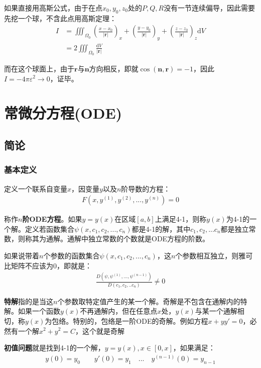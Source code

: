 \documentclass{ctexart}
\let\oldtextbf\textbf
\renewcommand{\textbf}[1]{\textcolor{brown!50!red}{\oldtextbf{#1}}}
\begin{document}
如果直接用高斯公式，由于在点$x_0,y_0,z_0$处的$P,Q,R$没有一节连续偏导，因此需要先挖一个球，不含此点用高斯定理：
\begin{align*} 
I&=\iiint_{\Omega_0}(\frac{x-x_0}{|\bm{r}|})_x+(\frac{y-y_0}{|\bm{r}|})_y+
(\frac{z-z_0}{|\bm{r}|})_z\mathrm{d}V\\
&=2\iiint_{\Omega_0}\frac{\mathrm{d}V }{|\bm{r}|} 
\end{align*}

而在这个球面上，由于$\bm{r}$与$\bm{n}$方向相反，即就$\cos(\bm{n},\bm{r})=-1$，因此$I=-4\pi\varepsilon^2\to 0$，证毕。

\section{常微分方程(ODE)}
\subsection{简论}
\subsubsection{基本定义}
定义一个联系自变量$x$，因变量$y$以及$n$阶导数的方程：
\begin{align*} 
  F(x,y^{(1)},y^{(2)},...,y^{(n)})=0\tag{4-1}
\end{align*}

称作\textbf{$n$阶ODE方程}。如果$y=y(x)$在区域$[a,b]$上满足4-1，则称$y(x)$为4-1的一个解。定义若函数集合$\psi(x,c_1,c_2,...,c_n)$都是4-1的解，其中$c_1,c_2,...c_n$都是独立常数，则称其为通解。通解中独立常数的个数就是ODE方程的阶数。

如果说带着$n$个参数的函数集合$\psi(x,c_1,c_2,...,c_n)$，这$n$个参数相互独立，则雅可比矩阵不应该为0，即就是：
\begin{align*} 
  \frac{D(\psi,\psi^{(1)},...,\psi^{(n-1)})}{D(c_1,c_2,..c_n)}\neq0\tag{4-2}
\end{align*}

\textbf{特解}指的是当这$n$个参数取特定值产生的某一个解。奇解是不包含在通解内的特解。如果一个函数$y(x)$不再通解内，但在任意点$x$处，$y(x)$与某一个通解相切，称$y(x)$为包络。特别的，包络是一阶ODE的奇解。例如方程$x+yy'=0$，必然有一个解$x^2+y^2=C$，这个就是奇解

\textbf{初值问题}就是找到4-1的一个解，$y=y(x),x\in[0,x]$，如果满足：
\begin{align*}
    y(0)=y_0\qquad y'(0)=y_1\quad...\quad y^{(n-1)}(0)=y_{n-1}
\end{align*}
\end{document}
